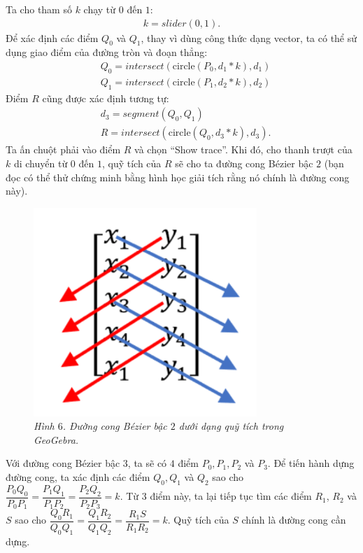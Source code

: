 \begin{multicols}{2}
		Ta cho tham số $k$ chạy từ $0$ đến $1$:
		\begin{align*}
			k = slider (0,1).
		\end{align*}
		Để xác định các điểm $Q_0$ và $Q_1$, thay vì dùng công thức dạng vector, ta có thể sử dụng giao điểm của đường tròn và đoạn thẳng:
		\begin{align*}
			&Q_0=intersect\left(\text{circle} (P_0,d_1*k),d_1\right)\\
			&Q_1=intersect\left(\text{circle} (P_1,d_2*k),d_2\right)
		\end{align*}
		Điểm $R$ cũng được xác định tương tự:
		\begin{align*}
			&d_3=segment(Q_0,Q_1 )\\
			&R=intersect\left(\text{circle} (Q_0,d_3*k),d_3\right).
		\end{align*}
		Ta ấn chuột phải vào điểm $R$ và chọn ``Show trace''. Khi đó, cho thanh trượt của $k$ di chuyển từ $0$ đến $1$, quỹ tích của $R$ sẽ cho ta đường cong Bézier bậc $2$ (bạn đọc có thể thử chứng minh bằng hình học giải tích rằng nó chính là đường cong này).
		\begin{figure}[H]
			\vspace*{-5pt}
			\centering
			\captionsetup{labelformat= empty, justification=centering}
			\includegraphics[width= 0.8\linewidth]{10}
			\caption{\small\textit{\color{toanhocdoisong}Hình $6$. Đường cong Bézier bậc $2$ dưới dạng quỹ tích trong GeoGebra.}}
			\vspace*{-10pt}
		\end{figure}
		Với đường cong Bézier bậc $3$, ta sẽ có $4$ điểm $P_0,P_1,P_2$ và $P_3$. Để tiến hành dựng đường cong, ta xác định các điểm $Q_0,Q_1$ và $Q_2$ sao cho $\dfrac{P_0 Q_0}{P_0 P_1}= \dfrac{P_1 Q_1}{P_1 P_2}= \dfrac{P_2 Q_2}{P_2 P_3} =k$. Từ $3$ điểm này, ta lại tiếp tục tìm các điểm $R_1$, $R_2$ và $S$ sao cho $\dfrac{Q_0 R_1}{Q_0 Q_1} = \dfrac{Q_1 R_2}{Q_1 Q_2}= \dfrac{R_1 S}{R_1 R_2}=k$. Quỹ tích của $S$ chính là đường cong cần dựng.

\end{multicols}
